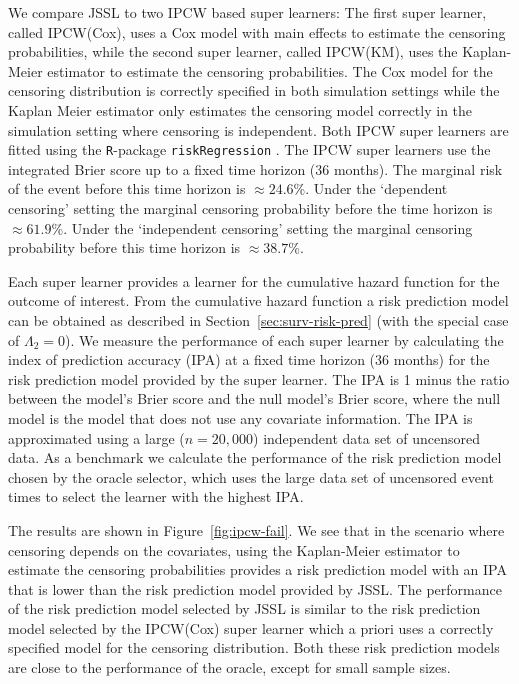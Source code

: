 \documentclass[a4paper,danish]{article}
\theoremstyle{plain} %
\numberwithin{theorem}{section}
\theoremstyle{definition} %
\theoremstyle{remark}
\newcommand{\1}{\mathds{1}}
\begin{document}
We compare JSSL to two IPCW based super learners: The
first super learner, called IPCW(Cox), uses a Cox model with main
effects to estimate the censoring probabilities, while the second
super learner, called IPCW(KM), uses the Kaplan-Meier estimator to
estimate the censoring probabilities. The Cox model for the censoring
distribution is correctly specified in both simulation settings while
the Kaplan Meier estimator only estimates the censoring model
correctly in the simulation setting where censoring is
independent. Both IPCW super learners are fitted using the
\texttt{R}-package \texttt{riskRegression}
\citep{Gerds_Ohlendorff_Ozenne_2023}.
%
%
The IPCW super learners use the integrated Brier score up to a fixed time
horizon (36 months). The marginal risk of the event before this time horizon is
\(\approx 24.6\)\%. Under the `dependent censoring' setting the marginal
censoring probability before the time horizon is \(\approx 61.9\)\%. Under the
`independent censoring' setting the marginal censoring probability before this
time horizon is \( \approx 38.7 \)\%.

Each super learner provides a learner for the cumulative
hazard function for the outcome of interest. From the
cumulative hazard function a risk prediction model can be
obtained as described in Section~\ref{sec:surv-risk-pred}
(with the special case of $\Lambda_2 = 0$). We measure the
performance of each super learner by calculating the index of
prediction accuracy (IPA) \citep{kattan2018index} at a fixed
time horizon (36 months) for the risk prediction model
provided by the super learner. The IPA is 1 minus the ratio
between the model's Brier score and the null model's Brier
score, where the null model is the model that does not use any
covariate information. The IPA is approximated using a large
(\( n = 20,000 \)) independent data set of uncensored data. As
a benchmark we calculate the performance of the risk
prediction model chosen by the oracle selector, which uses the
large data set of uncensored event times to select the learner
with the highest IPA.

The results are shown in Figure~\ref{fig:ipcw-fail}. We see that in
the scenario where censoring depends on the covariates, using the
Kaplan-Meier estimator to estimate the censoring probabilities
provides a risk prediction model with an IPA that is lower than the
risk prediction model provided by JSSL. The performance
of the risk prediction model selected by JSSL is similar
to the risk prediction model selected by the IPCW(Cox) super learner
which a priori uses a correctly specified model for the censoring
distribution. Both these risk prediction models are close to the
performance of the oracle, except for small sample sizes.
\end{document}
